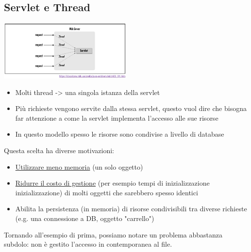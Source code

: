 \subsection{Servlet e Thread}
\begin{center}
    \includegraphics[width=0.5\textwidth]{img/appWeb10.jpg}
\end{center}
\begin{itemize}
    \item Molti thread -> una singola istanza della servlet
    \item Più richieste vengono servite dalla stessa servlet, questo vuol dire che bisogna far attenzione a come la servlet implementa l'accesso alle sue risorse
    \item In questo modello spesso le risorse sono condivise a livello di database
\end{itemize}
Questa scelta ha diverse motivazioni:
\begin{itemize}
    \item \underline{Utilizzare meno memoria} (un solo oggetto)
    \item \underline{Ridurre il costo di gestione} (per esempio tempi di inizializzazione inizializzazione) di molti oggetti che sarebbero spesso identici
    \item Abilita la persistenza (in memoria) di risorse condivisibili tra diverse richieste (e.g. una connessione a DB, oggetto "carrello")
\end{itemize}
Tornando all'esempio di prima, possiamo notare un problema abbastanza subdolo: non è gestito l'accesso in contemporanea al file. 


